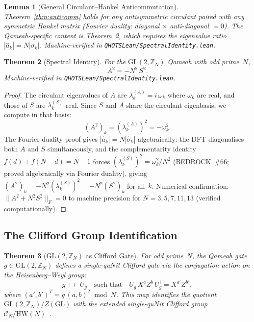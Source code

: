 \documentclass[aip,jmp,reprint,superscriptaddress,floatfix,nofootinbib]{revtex4-2}
\newtheorem{theorem}{Theorem}
\newtheorem{lemma}[theorem]{Lemma}
\theoremstyle{definition}
\theoremstyle{remark}
\newcommand{\ZN}{\mathbb{Z}_N}
\newcommand{\GL}{\mathrm{GL}}
\newcommand{\HW}{\mathrm{HW}}
\begin{document}
\begin{lemma}[General Circulant--Hankel Anticommutation]
\label{lem:general-anticomm}
Theorem~\ref{thm:anticomm} holds for \emph{any} antisymmetric
circulant paired with \emph{any} symmetric Hankel matrix (Fourier
duality: diagonal $\times$ anti-diagonal $= 0$).  The
Qameah-specific content is Theorem~\ref{thm:spectral-identity}, which
requires the eigenvalue ratio $|\hat{a}_k| = N|\sigma_k|$.
Machine-verified in \texttt{QHOTSLean/SpectralIdentity.lean}.
\end{lemma}

\begin{theorem}[Spectral Identity]\label{thm:spectral-identity}
For the $\GL(2,\ZN)$ Qameah with odd prime~$N$,
\begin{equation}\label{eq:A2}
A^2 = -N^2\, S^2.
\end{equation}
Machine-verified in \texttt{QHOTSLean/SpectralIdentity.lean}.
\end{theorem}

\begin{proof}
The circulant eigenvalues of $A$ are $\lambda_k^{(A)} = i\,\omega_k$
where $\omega_k$ are real, and those of $S$ are $\lambda_k^{(S)}$
real.  Since $S$ and $A$ share the circulant eigenbasis, we compute
in that basis:
\begin{equation}
(A^2)_k = (\lambda_k^{(A)})^2 = -\omega_k^2.
\end{equation}
The Fourier duality proof gives $|\hat{a}_k| = N|\hat{\sigma}_k|$
algebraically: the DFT diagonalises both $A$ and $S$ simultaneously,
and the complementarity identity $f(d)+f(N{-}d) = N{-}1$ forces
$(\lambda_k^{(S)})^2 = \omega_k^2/N^2$ (BEDROCK~\#66;
proved algebraically via Fourier duality), giving
$(A^2)_k = -N^2(\lambda_k^{(S)})^2 = -N^2(S^2)_k$ for all~$k$.
Numerical confirmation: $\|A^2 + N^2 S^2\|_F = 0$ to machine precision
for $N = 3, 5, 7, 11, 13$ (verified computationally).
\end{proof}

\subsection{The Clifford Group Identification}
\label{sec:gl2:clifford}

\begin{theorem}[$\GL(2,\ZN)$ as Clifford Gate]\label{thm:clifford-gate}
For odd prime~$N$, the Qameah gate $g \in \GL(2,\ZN)$ defines a
single-qu$N$it Clifford gate via the conjugation action on the
Heisenberg--Weyl group:
\begin{equation}\label{eq:clifford-action}
g \;\mapsto\; U_g \quad\text{such that}\quad
U_g\, X^a Z^b\, U_g^\dagger
  = X^{a'} Z^{b'},
\end{equation}
where $(a', b')^T = g\,(a, b)^T \bmod N$.  This map identifies the
quotient $\GL(2,\ZN) / Z(\GL)$ with the extended single-qu$N$it
Clifford group $\mathcal{C}_N / \HW(N)$~\cite{Zhu2017}.
\end{theorem}
\end{document}
